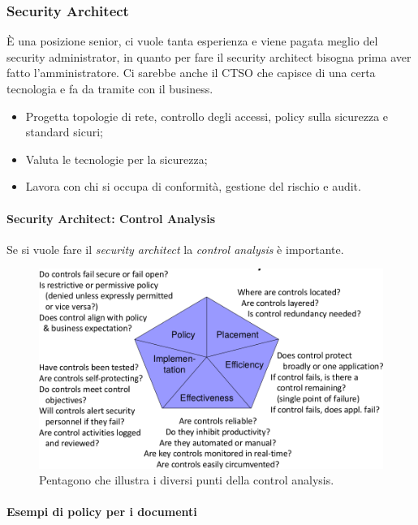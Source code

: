 \subsubsection{Security Architect}

È una posizione senior, ci vuole tanta esperienza e viene pagata meglio del
security administrator, in quanto per fare il security architect bisogna
prima aver fatto l'amministratore.
Ci sarebbe anche il CTSO che capisce di una certa tecnologia e fa da tramite
con il business.

\begin{itemize}
\item Progetta topologie di rete, controllo degli accessi, policy sulla
sicurezza e standard sicuri;
\item Valuta le tecnologie per la sicurezza;
\item Lavora con chi si occupa di conformità, gestione del rischio e audit.
\end{itemize}

\paragraph{Security Architect: Control Analysis}

Se si vuole fare il \textit{security architect} la \textit{control analysis} è
importante.

\begin{figure}[h!]
        \begin{center}
                \includegraphics[scale=0.3]{res/img/penta}
        \end{center}
        \caption{Pentagono che illustra i diversi punti della control analysis.}
\end{figure}

\paragraph*{Esempi di policy per i documenti}

